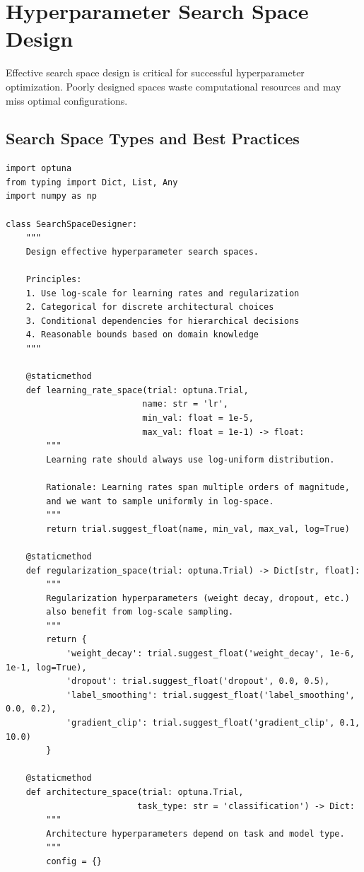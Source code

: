 \section{Hyperparameter Search Space Design}

Effective search space design is critical for successful hyperparameter optimization. Poorly designed spaces waste computational resources and may miss optimal configurations.

\subsection{Search Space Types and Best Practices}

\begin{lstlisting}[style=python, caption=Search space design patterns]
import optuna
from typing import Dict, List, Any
import numpy as np

class SearchSpaceDesigner:
    """
    Design effective hyperparameter search spaces.

    Principles:
    1. Use log-scale for learning rates and regularization
    2. Categorical for discrete architectural choices
    3. Conditional dependencies for hierarchical decisions
    4. Reasonable bounds based on domain knowledge
    """

    @staticmethod
    def learning_rate_space(trial: optuna.Trial,
                           name: str = 'lr',
                           min_val: float = 1e-5,
                           max_val: float = 1e-1) -> float:
        """
        Learning rate should always use log-uniform distribution.

        Rationale: Learning rates span multiple orders of magnitude,
        and we want to sample uniformly in log-space.
        """
        return trial.suggest_float(name, min_val, max_val, log=True)

    @staticmethod
    def regularization_space(trial: optuna.Trial) -> Dict[str, float]:
        """
        Regularization hyperparameters (weight decay, dropout, etc.)
        also benefit from log-scale sampling.
        """
        return {
            'weight_decay': trial.suggest_float('weight_decay', 1e-6, 1e-1, log=True),
            'dropout': trial.suggest_float('dropout', 0.0, 0.5),
            'label_smoothing': trial.suggest_float('label_smoothing', 0.0, 0.2),
            'gradient_clip': trial.suggest_float('gradient_clip', 0.1, 10.0)
        }

    @staticmethod
    def architecture_space(trial: optuna.Trial,
                          task_type: str = 'classification') -> Dict:
        """
        Architecture hyperparameters depend on task and model type.
        """
        config = {}


\end{lstlisting}
